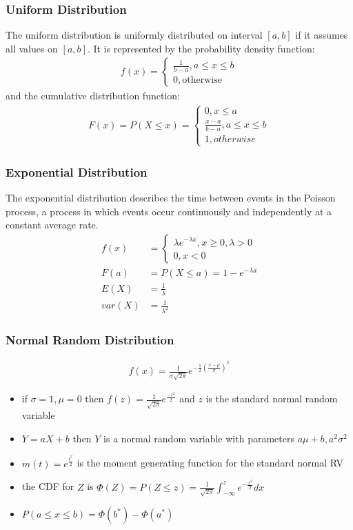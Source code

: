 \documentclass[12pt]{article}
\begin{document}
\subsubsection{Uniform Distribution}
The uniform distribution is uniformly distributed on interval $[a, b]$ if it assumes all values on $[a, b]$. It is represented by the probability density function:
\begin{align*}
	f(x) = \begin{cases}
		\frac{1}{b-a}, a\le x\le b \\
		0, \text{otherwise}
	\end{cases}
\end{align*}
 and the cumulative distribution function:
 \begin{align*}
	 F(x)=P(X\le x)= \begin{cases}
		 0, x\le a \\
		 \frac{x-a}{b-a}, a\le x\le b \\
		 1, otherwise
	 \end{cases}
 \end{align*}
 
 \subsubsection{Exponential Distribution}
 The exponential distribution describes the time between events in the Poisson process, a process in which events occur continuously and independently at a constant average rate.
 \begin{align*}
	 f(x) &= \begin{cases}
		 \lambda e^{-\lambda x}, x \ge 0, \lambda > 0 \\
		 0, x < 0
	 \end{cases} \\
	 F(a) &= P(X\le a)=1-e^{-\lambda a} \\
	 E(X) &= \frac{1}{\lambda} \\
	 var(X) &= \frac{1}{\lambda^2}
 \end{align*}

\subsubsection{Normal Random Distribution}
\begin{align*}
	f(x) = \frac{1}{\sigma\sqrt{2\pi}}e^{-\frac{1}{2}(\frac{x-\mu}{\sigma})^2}
\end{align*}
\begin{itemize}
	\item if $\sigma = 1, \mu = 0$ then $f(z) = \frac{1}{\sqrt{2\pi}}e^{\frac{-z^2}{2}}$ and $z$ is the standard normal random variable
	\item $Y=aX+b$ then $Y$ is a normal random variable with parameters $a\mu + b, a^2 \sigma^2$
	\item $m(t) = e^{\frac{t^2}{2}}$ is the moment generating function for the standard normal RV
	\item the CDF for $Z$ is $\Phi (Z) = P(Z\le z) = \frac{1}{\sqrt{2\pi}}\int_{-\infty}^{z}e^{-\frac{x^2}{2}}dx$
	\item $P(a\le x\le b) = \Phi (b^*) - \Phi (a^*)$
\end{itemize}
\end{document}
